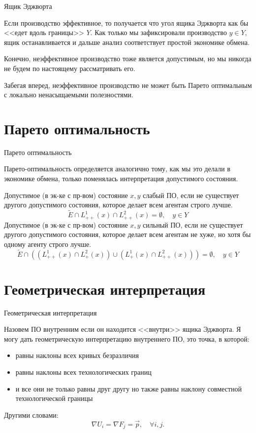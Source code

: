 \documentclass{beamer}
\begin{document}
\begin{frame}{Ящик Эджворта}

Если производство эффективное, то получается что угол ящика Эджворта как бы <<едет вдоль границы>> $Y$. Как только мы зафиксировали производство $y \in Y$, ящик останавливается и дальше анализ соответствует простой экономике обмена.

Конечно, неэффективное производство тоже является допустимым, но мы никогда не будем по настоящему рассматривать его.

Забегая вперед, неэффективное производство не может быть Парето оптимальным с локально ненасыщаемыми полезностями.

\end{frame}

\section{Парето оптимальность}

\begin{frame}{Парето оптимальность}

Парето-оптимальность определяется аналогично тому, как мы это делали в экономике обмена, только поменялась интерпретация допустимого состояния.

Допустимое (в эк-ке с пр-вом) состояние $x,y$ \alert{слабый ПО}, если не существует другого допустимого состояния, которое делает всем агентам строго лучше.
$$ \tilde E \cap L^1_{++}(x) \cap L^2_{++}(x) = \emptyset, \quad y \in Y$$
Допустимое (в эк-ке с пр-вом) состояние $x,y$ \alert{сильный ПО}, если не существует другого допустимого состояния, которое делает всем агентам не хуже, но хотя бы одному агенту строго лучше.
$$ \tilde E \cap ((L^1_{++}(x) \cap L^2_{+}(x)) \cup (L^1_{+}(x) \cap L^2_{++}(x))) = \emptyset, \quad y \in Y$$

\end{frame}

\section{Геометрическая интерпретация}

\begin{frame}{Геометрическая интерпретация}

Назовем ПО \alert{внутренним} если он находится <<внутри>> ящика Эджворта. Я могу дать геометрическую интерпретацию внутреннего ПО, это точка, в которой:
\begin{itemize}
  \item равны наклоны всех кривых безразличия
  \item равны наклоны всех технологических границ
  \item и все они не только равны друг другу но также равны наклону совместной технологической границы
\end{itemize}

Другими словами:
$$ \nabla U_i = \nabla F_j = \vec p, \quad \forall i,j.$$ 

\end{frame}
\end{document}
